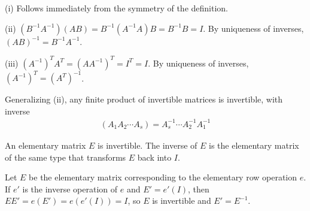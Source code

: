 \documentclass[12pt,letterpaper,reqno]{article}
\numberwithin{equation}{section}
\begin{document}
\begin{pf} 
(i) Follows immediately from the symmetry of the definition. 

(ii) $(B^{-1}A^{-1})(AB)=B^{-1}(A^{-1}A)B=B^{-1}B=I$. By uniqueness of inverses, $(AB)^{-1}=B^{-1}A^{-1}$.

(iii) $(A^{-1})^TA^T=(AA^{-1})^T=I^T=I$. By uniqueness of inverses, $(A^{-1})^T=(A^T)^{-1}$. 

Generalizing (ii), any finite product of invertible matrices is invertible, with inverse
\begin{align*}
	(A_1A_2\cdots A_s)=A_s^{-1} \cdots A_2^{-1}A_1^{-1}
\end{align*}	
\end{pf}

\begin{thm}\label{thm:elementary_matrices_are_invertible}
An elementary matrix $E$ is invertible. The inverse of $E$ is the elementary matrix of the same type that transforms $E$ back into $I$.
\end{thm}

\begin{pf}
Let $E$ be the elementary matrix corresponding to the elementary row operation $e$. If $e'$ is the inverse operation of $e$ and $E'=e'(I)$, then $EE'=e(E')=e(e'(I))=I$, so $E$ is invertible and $E'=E^{-1}$.	
\end{pf}
\end{document}
